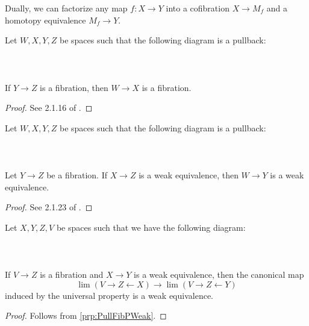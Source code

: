 Dually, we can factorize any map $f:X\to Y$ into a cofibration $X\to M_f$ and a homotopy equivalence $M_f\to Y$. 
\
\begin{prp}\label{prp:PullPFib} Let $W,X,Y,Z$ be spaces such that the following diagram is a pullback: \\~\\
\\~\\
If $Y\to Z$ is a fibration, then $W\to X$ is a fibration. 
\begin{proof}
See 2.1.16 of \cite{CHT}. 
\end{proof}
\end{prp}

\begin{prp}\label{prp:PullFibPWeak} Let $W,X,Y,Z$ be spaces such that the following diagram is a pullback: \\~\\
\\~\\
Let $Y\to Z$ be a fibration. If $X\to Z$ is a weak equivalence, then $W\to Y$ is a weak equivalence. 
\begin{proof}
See 2.1.23 of \cite{CHT}. 
\end{proof}
\end{prp}

\begin{prp}\label{prp:WeakLims} Let $X,Y,Z,V$ be spaces such that we have the following diagram: \\~\\
\\~\\
If $V\to Z$ is a fibration and $X\to Y$ is a weak equivalence, then the canonical map $$\lim(V\rightarrow Z\leftarrow X)\to\lim(V\rightarrow Z\leftarrow Y)$$ induced by the universal property is a weak equivalence. 
\begin{proof}
Follows from \ref{prp:PullFibPWeak}. 
\end{proof}
\end{prp}

